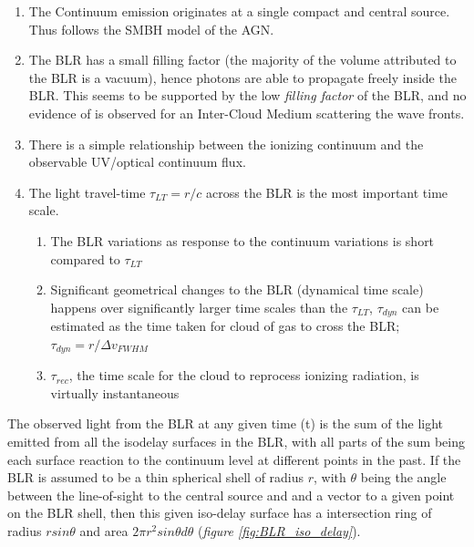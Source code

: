 \documentclass[a4paper, 12pt, twoside]{article}
\begin{document}
\begin{enumerate}
\item The Continuum emission originates at a single compact and central source. Thus follows the SMBH model of the AGN. 
\item The BLR has a small filling factor (the majority of the volume attributed to the BLR is a vacuum), hence photons are able to propagate freely inside the BLR. This seems to be supported by the low \emph{filling factor} of the BLR, and no evidence of is observed for an Inter-Cloud Medium scattering the wave fronts.
\item There is a simple relationship between the ionizing continuum and the observable UV/optical continuum flux.
\item The light travel-time $\tau_{LT}=r/c$ across the BLR is the most important time scale. 
\begin{enumerate}
\item The BLR variations as response to the continuum variations is short compared to $\tau_{LT}$
\item Significant geometrical changes to the BLR (dynamical time scale) happens over significantly larger time scales than the $\tau_{LT}$, $\tau_{dyn}$ can be estimated as the time taken for cloud of gas to cross the BLR; $\tau_{dyn} = r/\Delta v_{FWHM}$
\item $\tau_{rec}$, the time scale for the cloud to reprocess ionizing radiation, is virtually instantaneous
\end{enumerate}
\end{enumerate}
The observed light from the BLR at any given time (t) is the sum of the light emitted from all the isodelay surfaces in the BLR, with all parts of the sum being each surface reaction to the continuum level at different points in the past. If the BLR is assumed to be a thin spherical shell of radius $r$, with $\theta$ being the angle between the line-of-sight to the central source and and a vector to a given point on the BLR shell, then this given iso-delay surface has a intersection ring of radius $rsin\theta$ and area $2\pi r^{2}sin\theta d\theta$ (\emph{figure \ref{fig:BLR_iso_delay}}).
\end{document}
